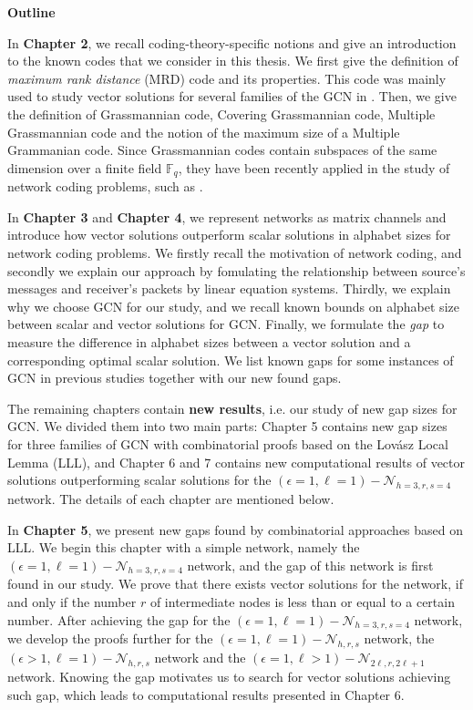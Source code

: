 \textbf{Outline}

In \textbf{Chapter 2}, we recall coding-theory-specific notions and
give an introduction to the known codes that we consider in this thesis.
We first give the definition of \textit{maximum rank distance} (MRD)
code and its properties. This code was mainly used to study vector
solutions for several families of the GCN in \cite{Wachter-Zeh:2018}.
Then, we give the definition of Grassmannian code, Covering Grassmannian
code, Multiple Grassmannian code and the notion of the maximum size
of a Multiple Grammanian code. Since Grassmannian codes contain subspaces
of the same dimension over a finite field $\ensuremath{\mathbb{F}}_{q}$,
they have been recently applied in the study of network coding problems,
such as \cite{Etzion:2016,Etzion:2018,Wachter-Zeh:2018,Zhang:2019}.

In \textbf{Chapter 3} and \textbf{Chapter 4}, we represent networks
as matrix channels and introduce how vector solutions outperform scalar
solutions in alphabet sizes for network coding problems. We firstly
recall the motivation of network coding, and secondly we explain our
approach by fomulating the relationship between source's messages
and receiver's packets by linear equation systems. Thirdly, we explain
why we choose GCN for our study, and we recall known bounds on alphabet
size between scalar and vector solutions for GCN. Finally, we formulate
the \textit{gap} to measure the difference in alphabet sizes between
a vector solution and a corresponding optimal scalar solution. We
list known gaps for some instances of GCN in previous studies together
with our new found gaps.

The remaining chapters contain \textbf{new results}, i.e. our study
of new gap sizes for GCN. We divided them into two main parts: Chapter
5 contains new gap sizes for three families of GCN with combinatorial
proofs based on the Lov\'asz Local Lemma (LLL), and Chapter 6 and
7 contains new computational results of vector solutions outperforming
scalar solutions for the $\left(\epsilon=1,\ell=1\right)-\mathcal{N}_{h=3,r,s=4}$
network. The details of each chapter are mentioned below.

In \textbf{Chapter 5}, we present new gaps found by combinatorial
approaches based on LLL. We begin this chapter with a simple network,
namely the $\left(\epsilon=1,\ell=1\right)-\mathcal{N}_{h=3,r,s=4}$
network, and the gap of this network is first found in our study.
We prove that there exists vector solutions for the network, if and
only if the number $r$ of intermediate nodes is less than or equal
to a certain number. After achieving the gap for the $\left(\epsilon=1,\ell=1\right)-\mathcal{N}_{h=3,r,s=4}$
network, we develop the proofs further for the $\left(\epsilon=1,\ell=1\right)-\mathcal{N}_{h,r,s}$
network, the $\left(\epsilon>1,\ell=1\right)-\mathcal{N}_{h,r,s}$
network and the $\left(\epsilon=1,\ell>1\right)-\mathcal{N}_{2\ell,r,2\ell+1}$
network. Knowing the gap motivates us to search for vector solutions
achieving such gap, which leads to computational results presented
in Chapter 6.


